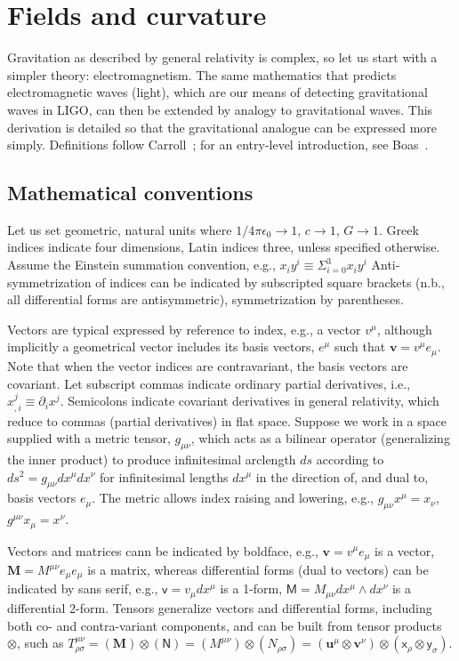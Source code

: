 \chapter{Fields and curvature}
\label{field_curvature_math}
    
    Gravitation as described by general relativity is complex, so let us start with a simpler theory: electromagnetism. 
The same mathematics that predicts electromagnetic waves (light), which are our means of detecting gravitational waves in LIGO, can then be extended by analogy to gravitational waves.
This derivation is detailed so that the gravitational analogue can be expressed more simply.
Definitions follow Carroll~\cite{Carroll1997}; for an entry-level introduction, see Boas~\cite{Boas}.

\section{Mathematical conventions}

    Let us set geometric, natural units where $1/4\pi\epsilon_0 \rightarrow 1$, $c \rightarrow 1$, $G \rightarrow 1$. 
Greek indices indicate four dimensions, Latin indices three, unless specified otherwise.
Assume the Einstein summation convention, e.g., $x_i y^i \equiv \Sigma_{i=0}^3 x_i y^i$
Anti-symmetrization of indices can be indicated by subscripted square brackets (n.b., all differential forms are antisymmetric), symmetrization by parentheses.

Vectors are typical expressed by reference to index, e.g., a vector $v^\mu$, although implicitly a geometrical vector includes its basis vectors, $e^\mu$ such that $\textbf{v} = v^\mu e_\mu$.
Note that when the vector indices are contravariant, the basis vectors are covariant.
Let subscript commas indicate ordinary partial derivatives, i.e., $x_{,i}^j \equiv \partial_i x^j$.
Semicolons indicate covariant derivatives in general relativity, which reduce to commas (partial derivatives) in flat space. 
Suppose we work in a space supplied with a metric tensor, $g_{\mu\nu}$, which acts as a bilinear operator (generalizing the inner product) to produce infinitesimal arclength $ds$ according to $ds^2 = g_{\mu \nu} dx^\mu dx^\nu$ for infinitesimal lengths $dx^\mu$ in the direction of, and dual to, basis vectors $e_\mu$. 
The metric allows index raising and lowering, e.g., $g_{\mu \nu} x^\mu = x_\nu$, $g^{\mu \nu} x_\mu = x^\nu$.

Vectors and matrices cann be indicated by boldface, e.g., $\textbf{v} = v^\mu e_\mu$ is a vector, $\textbf{M} = M^{\mu\nu} e_\mu e_\mu $ is a matrix, whereas differential forms (dual to vectors) can be indicated by sans serif, e.g., $\textsf{v} = v_\mu dx^\mu$ is a 1-form, $\textsf{M} = M_{\mu\nu} dx^\mu \wedge dx^\nu$ is a differential 2-form.
Tensors generalize vectors and differential forms, including both co- and contra-variant components, and can be built from tensor products $\otimes$, such as $T^{\mu\nu}_{\rho\sigma} = (\textbf{M})\otimes (\textsf{N}) = (M^{\mu\nu}) \otimes (N_{\rho\sigma})= (\textbf{u}^\mu \otimes \textbf{v}^\nu) \otimes (\textsf{x}_\rho \otimes \textsf{y}_\sigma)$.

